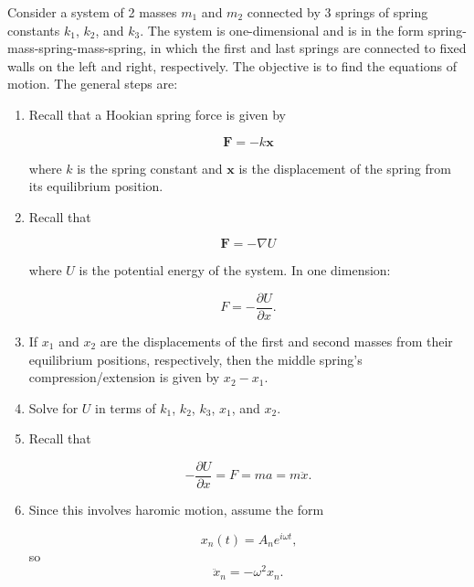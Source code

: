 Consider a system of 2 masses $m_1$ and $m_2$ connected by 3 springs of spring constants $k_1$, $k_2$, and $k_3$. The system is one-dimensional and is in the form spring-mass-spring-mass-spring, in which the first and last springs are connected to fixed walls on the left and right, respectively. The objective is to find the equations of motion. The general steps are:

\begin{enumerate}
    \item Recall that a Hookian spring force is given by

          \begin{equation*}
              \mathbf{F} = -k\mathbf{x}
          \end{equation*}

          where $k$ is the spring constant and $\mathbf{x}$ is the displacement of the spring from its equilibrium position.
    \item Recall that

          \begin{equation*}
              \mathbf{F} = -\nabla U
          \end{equation*}

          where $U$ is the potential energy of the system. In one dimension:

          \begin{equation*}
              F = -\frac{\partial U}{\partial x}\text{.}
          \end{equation*}

    \item If $x_1$ and $x_2$ are the displacements of the first and second masses from their equilibrium positions, respectively, then the middle spring's compression/extension is given by $x_2 - x_1$.
    \item Solve for $U$ in terms of $k_1$, $k_2$, $k_3$, $x_1$, and $x_2$.
    \item Recall that

          \begin{equation*}
              -\frac{\partial U}{\partial x} = F = ma = m\ddot{x}\text{.}
          \end{equation*}

    \item Since this involves haromic motion, assume the form

          \begin{equation*}
              x_n(t) = A_n e^{i\omega t}\text{,}
          \end{equation*}
          so
          \begin{equation*}
              \ddot{x}_n = -\omega^2 x_n\text{.}
          \end{equation*}


\end{enumerate}
